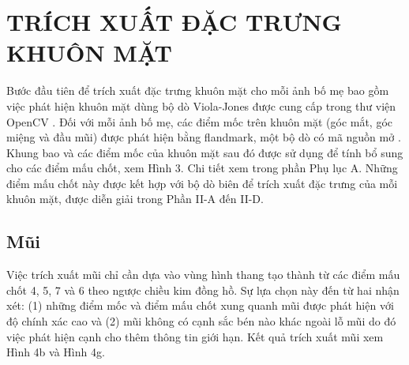 \documentclass[conference]{IEEEtran}
\begin{document}
\section{TRÍCH XUẤT ĐẶC TRƯNG KHUÔN MẶT}
Bước đầu tiên để trích xuất đặc trưng khuôn mặt cho mỗi ảnh bố mẹ bao gồm việc phát hiện khuôn mặt dùng bộ dò Viola-Jones được cung cấp trong thư viện OpenCV \cite{ref:r2}. Đối với mỗi ảnh bố mẹ, các điểm mốc trên khuôn mặt (góc mắt, góc miệng và đầu mũi) được phát hiện bằng flandmark, một bộ dò có mã nguồn mở \cite{ref:r3}. Khung bao và các điểm mốc của khuôn mặt sau đó được sử dụng để tính bổ sung cho các điểm mấu chốt, xem Hình 3. Chi tiết xem trong phần Phụ lục A. Những điểm mấu chốt này được kết hợp với bộ dò biên để trích xuất đặc trưng của mỗi khuôn mặt, được diễn giải trong Phần II-A đến II-D.

\subsection{Mũi}

Việc trích xuất mũi chỉ cần dựa vào vùng hình thang tạo thành từ các điểm mấu chốt 4, 5, 7 và 6 theo ngược chiều kim đồng hồ. Sự lựa chọn này đến từ hai nhận xét: (1) những điểm mốc và điểm mấu chốt xung quanh mũi được phát hiện với độ chính xác cao và (2) mũi không có cạnh sắc bén nào khác ngoài lỗ mũi do đó việc phát hiện cạnh cho thêm thông tin giới hạn. Kết quả trích xuất mũi xem Hình 4b và Hình 4g.
\end{document}
